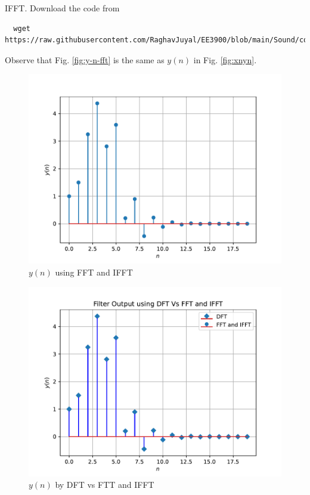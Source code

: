 \documentclass[journal,12pt,twocolumn]{IEEEtran}
\renewcommand\thesection{\arabic{section}}
\begin{document}
\begin{enumerate}[label=\thesection.\arabic*]
	IFFT.
	\solution Download the code from
	\begin{lstlisting}
  wget https://raw.githubusercontent.com/RaghavJuyal/EE3900/blob/main/Sound/codes/e6_4.py
	\end{lstlisting}
	Observe that Fig. \eqref{fig:y-n-fft} is the same as $y(n)$ in Fig. \eqref{fig:xnyn}.
	\begin{figure}
		\centering
		\includegraphics[width=\columnwidth]{figs/prob_6-4.pdf}
		\caption{$y(n)$ using FFT and IFFT}
		\label{fig:y-n-fft}
	\end{figure}
	\begin{figure}[!ht]
		\centering
		\includegraphics[width=\columnwidth]{figs/prob_6.pdf}
		\caption{$y(n)$ by DFT vs FTT and IFFT}

\end{figure}
\end{enumerate}
\end{document}
